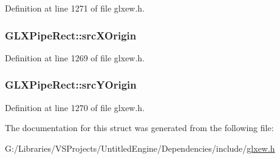 Definition at line 1271 of file glxew.\+h.

\hypertarget{struct_g_l_x_pipe_rect_a9df2313c01f75d149e64f2ff467bc266}{}
\subsubsection[{src\+X\+Origin}]{ G\+L\+X\+Pipe\+Rect\+::src\+X\+Origin}\label{struct_g_l_x_pipe_rect_a9df2313c01f75d149e64f2ff467bc266}


Definition at line 1269 of file glxew.\+h.

\hypertarget{struct_g_l_x_pipe_rect_a1f7316dff7050ab2ce9d3d37f8c5450e}{}
\subsubsection[{src\+Y\+Origin}]{ G\+L\+X\+Pipe\+Rect\+::src\+Y\+Origin}\label{struct_g_l_x_pipe_rect_a1f7316dff7050ab2ce9d3d37f8c5450e}


Definition at line 1270 of file glxew.\+h.



The documentation for this struct was generated from the following file\+:\begin{DoxyCompactItemize}
\item 
G\+:/\+Libraries/\+V\+S\+Projects/\+Untitled\+Engine/\+Dependencies/include/\hyperlink{glxew_8h}{glxew.\+h}\end{DoxyCompactItemize}
